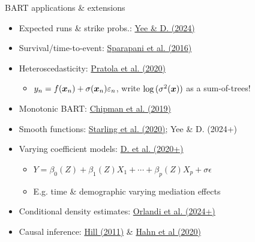 \documentclass[aspectratio=199]{beamer}
\begin{document}
\begin{frame}{BART applications \& extensions}

\begin{itemize}
\item{Expected runs \& strike probs.: \href{https://arxiv.org/abs/2305.05752}{Yee \& D. (2024)}}
\item{Survival/time-to-event: \href{https://onlinelibrary.wiley.com/doi/abs/10.1002/sim.6893}{Sparapani et al. (2016)}}
\item{Heteroscedasticity: \href{https://www.tandfonline.com/doi/abs/10.1080/10618600.2019.1677243?journalCode=ucgs20}{Pratola et al. (2020)}}
\begin{itemize}
\item{$y_{n} = f(\bm{x}_{n}) + \sigma(\bm{x}_{n})\varepsilon_{n}$, write $\log{(\sigma^{2}(\bm{x}))}$ as a sum-of-trees! }
\end{itemize}
\item{Monotonic BART: \href{https://arxiv.org/abs/1612.01619}{Chipman et al. (2019)}}
\item{Smooth functions: \href{https://projecteuclid.org/journals/annals-of-applied-statistics/volume-14/issue-1/BART-with-targeted-smoothing--An-analysis-of-patient-specific/10.1214/19-AOAS1268.short}{Starling et al. (2020)}; Yee \& D. (2024+)}
\item{Varying coefficient models: \href{https://arxiv.org/abs/2003.06416}{D. et al. (2020+)}}
\begin{itemize}
\item{$Y = \beta_{0}(Z) + \beta_{1}(Z)X_{1} + \cdots + \beta_{p}(Z)X_{p} + \sigma\epsilon$}
\item{E.g. time \& demographic varying mediation effects}
\end{itemize}
\item{Conditional density estimates: \href{https://arxiv.org/abs/2112.12259}{Orlandi et al. (2024+)}}
\item{Causal inference: \href{https://www.tandfonline.com/doi/abs/10.1198/jcgs.2010.08162}{Hill (2011)} \& \href{https://projecteuclid.org/journals/bayesian-analysis/volume-15/issue-3/Bayesian-Regression-Tree-Models-for-Causal-Inference--Regularization-Confounding/10.1214/19-BA1195.full}{Hahn et al (2020)}}
\end{itemize}

\end{frame}
\end{document}
